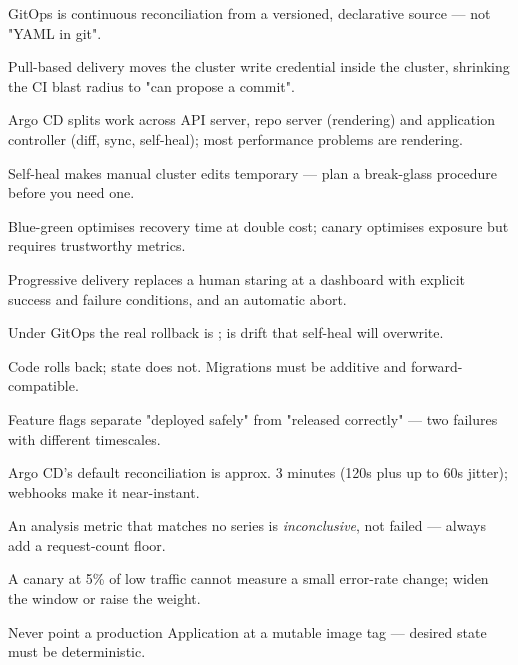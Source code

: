 
\begin{tickcheck}
  \item GitOps is continuous reconciliation from a versioned, declarative source --- not "YAML in git".
  \item Pull-based delivery moves the cluster write credential inside the cluster, shrinking the CI blast radius to "can propose a commit".
  \item Argo CD splits work across API server, repo server (rendering) and application controller (diff, sync, self-heal); most performance problems are rendering.
  \item Self-heal makes manual cluster edits temporary --- plan a break-glass procedure before you need one.
  \item Blue-green optimises recovery time at double cost; canary optimises exposure but requires trustworthy metrics.
  \item Progressive delivery replaces a human staring at a dashboard with explicit success and failure conditions, and an automatic abort.
  \item Under GitOps the real rollback is ;  is drift that self-heal will overwrite.
  \item Code rolls back; state does not. Migrations must be additive and forward-compatible.
  \item Feature flags separate "deployed safely" from "released correctly" --- two failures with different timescales.
\end{tickcheck}

\begin{wbitem}
  \item Argo CD's default reconciliation is approx. 3 minutes (120s plus up to 60s jitter); webhooks make it near-instant.
  \item An analysis metric that matches no series is \emph{inconclusive}, not failed --- always add a request-count floor.
  \item A canary at 5\% of low traffic cannot measure a small error-rate change; widen the window or raise the weight.
  \item Never point a production Application at a mutable  image tag --- desired state must be deterministic.
\end{wbitem}

